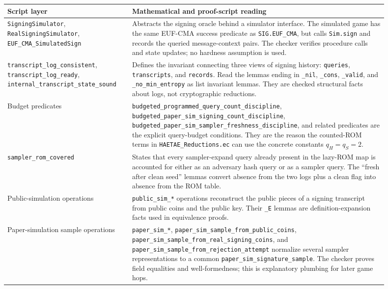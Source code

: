 \documentclass[11pt]{report}
\DeclareRobustCommand{\file}[1]{\ifmmode\text{\nolinkurl{#1}}\else\nolinkurl{#1}\fi}
\DeclareRobustCommand{\ec}[1]{\ifmmode\text{\nolinkurl{#1}}\else\nolinkurl{#1}\fi}
\theoremstyle{definition}
\theoremstyle{plain}
\begin{document}
\begin{longtable}{p{0.28\linewidth}p{0.62\linewidth}}
\toprule
\textbf{Script layer} & \textbf{Mathematical and proof-script reading} \\
\midrule
\ec{SigningSimulator}, \ec{RealSigningSimulator},
\ec{EUF\_CMA\_SimulatedSign} &
Abstracts the signing oracle behind a simulator interface.  The simulated game
has the same EUF-CMA success predicate as \ec{SIG.EUF\_CMA}, but calls
\ec{Sim.sign} and records the queried message-context pairs.  The checker
verifies procedure calls and state updates; no hardness assumption is used. \\
\ec{transcript\_log\_consistent},
\ec{transcript\_log\_ready},
\ec{internal\_transcript\_state\_sound} &
Defines the invariant connecting three views of signing history:
\ec{queries}, \ec{transcripts}, and \ec{records}.  Read the lemmas ending in
\ec{\_nil}, \ec{\_cons}, \ec{\_valid}, and \ec{\_no\_min\_entropy} as list
invariant lemmas.  They are checked structural facts about logs, not
cryptographic reductions. \\
Budget predicates &
\ec{budgeted\_programmed\_query\_count\_discipline},
\ec{budgeted\_paper\_sim\_signing\_count\_discipline},
\ec{budgeted\_paper\_sim\_sampler\_freshness\_discipline}, and related
predicates are the explicit query-budget conditions.  They are the reason the
counted-ROM terms in \file{HAETAE\_Reductions.ec} can use the concrete
constants \(q_H=q_S=2\). \\
\ec{sampler\_rom\_covered} &
States that every sampler-expand query already present in the lazy-ROM map is
accounted for either as an adversary hash query or as a sampler query.  The
``fresh after clean seed'' lemmas convert absence from the two logs plus a
clean flag into absence from the ROM table. \\
Public-simulation operations &
\ec{public\_sim\_*} operations reconstruct the public pieces of a signing
transcript from public coins and the public key.  Their \ec{\_E} lemmas are
definition-expansion facts used in equivalence proofs. \\
Paper-simulation sample operations &
\ec{paper\_sim\_*}, \ec{paper\_sim\_sample\_from\_public\_coins},
\ec{paper\_sim\_sample\_from\_real\_signing\_coins}, and
\ec{paper\_sim\_sample\_from\_rejection\_attempt} normalize several sampler
representations to a common \ec{paper\_sim\_signature\_sample}.  The checker
proves field equalities and well-formedness; this is explanatory plumbing for
later game hops. \\

\end{longtable}
\end{document}
